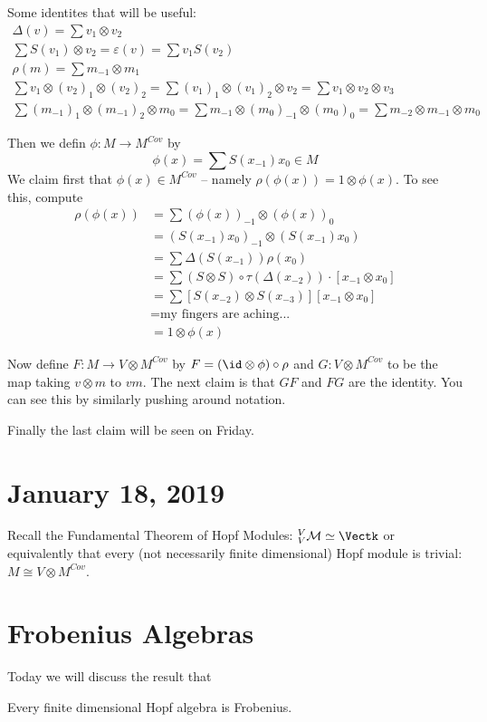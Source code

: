 \documentclass[12pt]{article}
\begin{document}
\begin{prf}
	Some identites that will be useful:
	\begin{align*}
		\Delta(v)=\sum v_1\otimes v_2\\
		\sum S(v_1)\otimes v_2=\varepsilon(v)=\sum v_1S(v_2)\\
		\rho(m)=\sum m_{-1}\otimes m_1\\
		\sum v_1\otimes (v_2)_1\otimes (v_2)_2=\sum (v_1)_1\otimes (v_1)_2\otimes v_2=\sum v_1\otimes v_2\otimes v_3\\
		\sum (m_{-1})_1\otimes (m_{-1})_2\otimes m_0=\sum m_{-1}\otimes (m_0)_{-1}\otimes (m_0)_0=\sum m_{-2}\otimes m_{-1}\otimes m_0
	\end{align*}

	Then we defin $\phi:M\to M^{Cov}$ by 
	\[\phi(x)=\sum S(x_{-1})x_0\in M\]
	We claim first that $\phi(x)\in M^{Cov}$ -- namely $\rho(\phi(x))=1\otimes\phi(x)$. To see this, compute
	\begin{align*}
		\rho(\phi(x)) &= \sum (\phi(x))_{-1}\otimes (\phi(x))_0\\
		&= (S(x_{-1})x_0)_{-1}\otimes (S(x_{-1})x_0)\\
		&= \sum\Delta(S(x_{-1}))\rho(x_0)\\
		&= \sum (S\otimes S)\circ \tau(\Delta(x_{-2}))\cdot [x_{-1}\otimes x_0]\\
		&=\sum[S(x_{-2})\otimes S(x_{-3})][x_{-1}\otimes x_0]\\
		&= \text{my fingers are aching...}\\
		&= 1\otimes\phi(x)
	\end{align*}

	Now define $F:M\to V\otimes M^{Cov}$ by $F=(\id\otimes\phi)\circ\rho$ and $G:V\otimes M^{Cov}$ 
	to be the map taking $v\otimes m$ to $vm$. The next claim is that $GF$ and $FG$ are the identity.
	You can see this by similarly pushing around notation.
	
	Finally the last claim will be seen on Friday.
\end{prf}
\section{January 18, 2019}
Recall the Fundamental Theorem of Hopf Modules: $_V^V\mathcal{M}\simeq \Vectk$ or equivalently that
every (not necessarily finite dimensional) Hopf module is trivial: $M\cong V\otimes M^{Cov}$.

\section{Frobenius Algebras}
Today we will discuss the result that
\begin{thm}\label{LS-69-2}
	Every finite dimensional Hopf algebra is Frobenius.
\end{thm}
\end{document}
